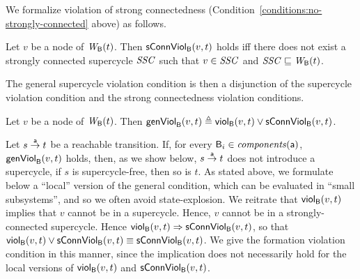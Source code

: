 
We formalize violation of strong connectedness (Condition~\ref{conditions:no-strongly-connected} above)
as follows.

\begin{definition}
\label{def:sConn.violation}
 Let $v$ be a node of $\wfg{\B}{t}$.   Then $\connViol{v}{t}$ holds iff there does not exist a 
strongly connected supercycle $\SSC$ such that $v \in \SSC$ and $\SSC \subg \wfg{\B}{t}$.
\end{definition}



The general supercycle violation condition is then a disjunction of the supercycle violation condition
and the strong connectedness violation conditions.


\begin{definition}
\label{def:formation.violation} 
\label{defn:formation.violation} 
Let $v$ be a node of $\wfg{\B}{t}$.
Then 
$\genViol{v}{t}  \df \scV{v}{t}  \lor \connViol{v}{t}$.
\end{definition}
%
Let $s \goesto[\act] t$ be a reachable transition. If, for every $\B_i \in \cmps{\act}$, $\formViol{v}{t}$ holds, then, as we show below,
$s \goesto[\act] t$ does not introduce a supercycle, \ie if $s$ is supercycle-free, then so is $t$. As stated above, we formulate below a ``local''
version of the general condition, which can be evaluated in ``small subsystems'', and so we often avoid state-explosion.
%
%
We reitrate that $\scV{v}{t}$ implies that $v$ cannot be in a supercycle. Hence, $v$ cannot be in a strongly-connected supercycle.
Hence $\scV{v}{t} \imp \connViol{v}{t}$, so that 
$\scV{v}{t}  \lor \connViol{v}{t} \ev  \connViol{v}{t}$.
We give the formation violation condition in this manner, since 
the implication does not necessarily hold for the local versions of $\scV{v}{t}$ and $\connViol{v}{t}$.

